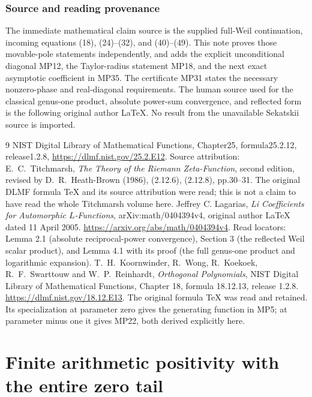 \section*{Source and reading provenance}
The immediate mathematical claim source is the supplied full-Weil
continuation, incoming equations (18), (24)--(32), and (40)--(49).
This note proves those movable-pole statements independently, and adds
the explicit unconditional diagonal MP12, the Taylor-radius statement
MP18, and the next exact asymptotic coefficient in MP35. The certificate
MP31 states the necessary nonzero-phase and real-diagonal requirements.
The human source used for the classical genus-one product, absolute
power-sum convergence, and reflected form is the following original
author LaTeX. No result from the unavailable Sekatskii source is imported.

\begin{thebibliography}{9}
NIST Digital Library of Mathematical Functions, Chapter25,
formula25.2.12, release1.2.8,
\url{https://dlmf.nist.gov/25.2.E12}.
Source attribution: E.~C.~Titchmarsh,
\emph{The Theory of the Riemann Zeta-Function}, second edition,
revised by D.~R.~Heath-Brown (1986), (2.12.6), (2.12.8), pp.30--31.
The original DLMF formula TeX and its source attribution were read;
this is not a claim to have read the whole Titchmarsh volume here.
Jeffrey C. Lagarias,
\emph{Li Coefficients for Automorphic $L$-Functions},
arXiv:math/0404394v4, original author LaTeX dated 11 April 2005.
\url{https://arxiv.org/abs/math/0404394v4}.
Read locators: Lemma 2.1 (absolute reciprocal-power convergence),
Section 3 (the reflected Weil scalar product), and Lemma 4.1 with its
proof (the full genus-one product and logarithmic expansion).
T.~H.~Koornwinder, R.~Wong, R.~Koekoek, R.~F.~Swarttouw and
W.~P.~Reinhardt, \emph{Orthogonal Polynomials}, NIST Digital
Library of Mathematical Functions, Chapter 18, formula 18.12.13,
release 1.2.8. \url{https://dlmf.nist.gov/18.12.E13}.
The original formula TeX was read and retained. Its specialization
at parameter zero gives the generating function in MP5; at
parameter minus one it gives MP22, both derived explicitly here.
\end{thebibliography}

\endgroup

\clearpage\begingroup
\part*{Finite arithmetic positivity with the entire zero tail}
\newcommand{\swcertW}{\mathcal W}
\newcommand{\swcertC}{\mathbb C}
\newcommand{\swcertR}{\mathbb R}
\newcommand{\swcertdiag}{\operatorname{diag}}



